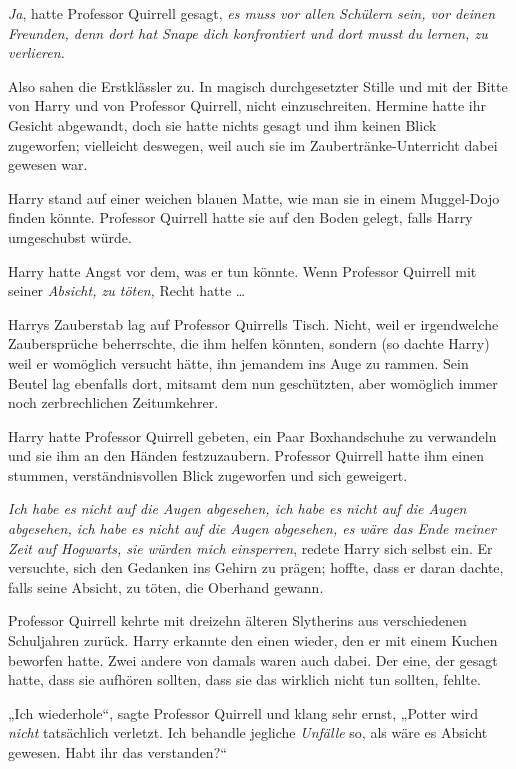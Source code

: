 {\later

\emph{Ja}, hatte Professor Quirrell gesagt, \emph{es muss vor allen Schülern sein, vor deinen Freunden, denn dort hat Snape dich konfrontiert und dort musst du lernen, zu verlieren.}

Also sahen die Erstklässler zu. In magisch durchgesetzter Stille und mit der Bitte von Harry und von Professor Quirrell, nicht einzuschreiten. Hermine hatte ihr Gesicht abgewandt, doch sie hatte nichts gesagt und ihm keinen Blick zugeworfen; vielleicht deswegen, weil auch sie im Zaubertränke-Unterricht dabei gewesen war.

Harry stand auf einer weichen blauen Matte, wie man sie in einem Muggel-Dojo finden könnte. Professor Quirrell hatte sie auf den Boden gelegt, falls Harry umgeschubst würde.

Harry hatte Angst vor dem, was er tun könnte. Wenn Professor Quirrell mit seiner \emph{Absicht, zu töten,} Recht hatte …

Harrys Zauberstab lag auf Professor Quirrells Tisch. Nicht, weil er irgendwelche Zaubersprüche beherrschte, die ihm helfen könnten, sondern (so dachte Harry) weil er womöglich versucht hätte, ihn jemandem ins Auge zu rammen. Sein Beutel lag ebenfalls dort, mitsamt dem nun geschützten, aber womöglich immer noch zerbrechlichen Zeitumkehrer.

Harry hatte Professor Quirrell gebeten, ein Paar Boxhandschuhe zu verwandeln und sie ihm an den Händen festzuzaubern. Professor Quirrell hatte ihm einen stummen, verständnisvollen Blick zugeworfen und sich geweigert.

\emph{Ich habe es nicht auf die Augen abgesehen, ich habe es nicht auf die Augen abgesehen, ich habe es nicht auf die Augen abgesehen, es wäre das Ende meiner Zeit auf Hogwarts, sie würden mich einsperren}, redete Harry sich selbst ein. Er versuchte, sich den Gedanken ins Gehirn zu prägen; hoffte, dass er daran dachte, falls seine Absicht, zu töten, die Oberhand gewann.

Professor Quirrell kehrte mit dreizehn älteren Slytherins aus verschiedenen Schuljahren zurück. Harry erkannte den einen wieder, den er mit einem Kuchen beworfen hatte. Zwei andere von damals waren auch dabei. Der eine, der gesagt hatte, dass sie aufhören sollten, dass sie das wirklich nicht tun sollten, fehlte.

„Ich wiederhole“, sagte Professor Quirrell und klang sehr ernst, „Potter wird \emph{nicht} tatsächlich verletzt. Ich behandle jegliche \emph{Unfälle} so, als wäre es Absicht gewesen. Habt ihr das verstanden?“

}
